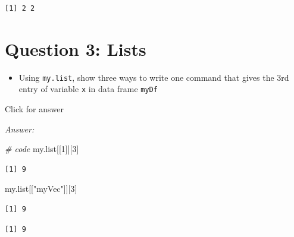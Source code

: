 \documentclass[
]{book}
\newenvironment{Shaded}{\begin{snugshade}}{\end{snugshade}}
\newcommand{\CommentTok}[1]{\textcolor[rgb]{0.56,0.35,0.01}{\textit{#1}}}
\newcommand{\DecValTok}[1]{\textcolor[rgb]{0.00,0.00,0.81}{#1}}
\newcommand{\NormalTok}[1]{#1}
\newcommand{\SpecialCharTok}[1]{\textcolor[rgb]{0.81,0.36,0.00}{\textbf{#1}}}
\newcommand{\StringTok}[1]{\textcolor[rgb]{0.31,0.60,0.02}{#1}}
\providecommand{\tightlist}{%
  \setlength{\itemsep}{0pt}\setlength{\parskip}{0pt}}
\begin{document}
\begin{verbatim}
[1] 2 2
\end{verbatim}

\hypertarget{question-3-lists}{%
\section{Question 3: Lists}\label{question-3-lists}}

\begin{itemize}
\tightlist
\item
  Using \texttt{my.list}, show three ways to write one command that gives the 3rd entry of variable \texttt{x} in data frame \texttt{myDf}
\end{itemize}

Click for answer

\emph{Answer:}

\begin{Shaded}
\begin{Highlighting}[]
\CommentTok{\# code}
\NormalTok{my.list[[}\DecValTok{1}\NormalTok{]][}\DecValTok{3}\NormalTok{]}
\end{Highlighting}
\end{Shaded}

\begin{verbatim}
[1] 9
\end{verbatim}

\begin{Shaded}
\begin{Highlighting}[]
\NormalTok{my.list[[}\StringTok{"myVec"}\NormalTok{]][}\DecValTok{3}\NormalTok{]}
\end{Highlighting}
\end{Shaded}

\begin{verbatim}
[1] 9
\end{verbatim}

\begin{Shaded}
\end{Shaded}

\begin{verbatim}
[1] 9
\end{verbatim}

\begin{Shaded}
\end{Shaded}
\end{document}
